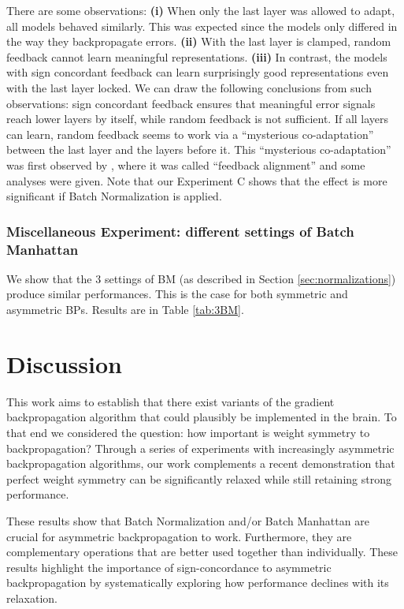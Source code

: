 \documentclass[letterpaper]{article}
\begin{document}
There are some observations: \textbf{(i)} When only the last layer was allowed to adapt, all models behaved similarly. This was expected since the models only differed in the way they backpropagate errors. \textbf{(ii)} With the last layer is clamped, random feedback cannot learn meaningful representations. \textbf{(iii)} In contrast, the models with sign concordant feedback can learn surprisingly good representations even with the last layer locked. We can draw the following conclusions from such observations: sign concordant feedback  ensures that meaningful error signals reach lower layers by itself, while random feedback is not sufficient. If all layers can learn, random feedback seems to work via a ``mysterious co-adaptation'' between the last layer and the layers before it. This ``mysterious co-adaptation'' was first observed by \cite{lillicrap2014random}, where it was called ``feedback alignment'' and some analyses were given. Note that our Experiment C shows that the effect is more significant if Batch Normalization is applied.



\subsubsection{Miscellaneous Experiment: different settings of Batch Manhattan} 

We show that the 3 settings of BM (as described in Section \ref{sec:normalizations}) produce similar performances. This is the case for both symmetric and asymmetric BPs. Results are in Table \ref{tab:3BM}.


\section{Discussion}
This work aims to establish that there exist variants of the gradient backpropagation algorithm that could plausibly be implemented in the brain. To that end we considered the question: how important is weight symmetry to backpropagation? Through a series of experiments with increasingly  asymmetric backpropagation algorithms, our work complements a recent  demonstration\cite{lillicrap2014random}  that perfect weight symmetry can be significantly relaxed while still retaining strong performance. 

These results show that Batch Normalization and/or Batch Manhattan are crucial for asymmetric backpropagation to work. Furthermore, they are complementary operations that are better used together than individually. These results highlight the importance of sign-concordance to asymmetric backpropagation by systematically exploring how performance declines with its relaxation.
\end{document}
